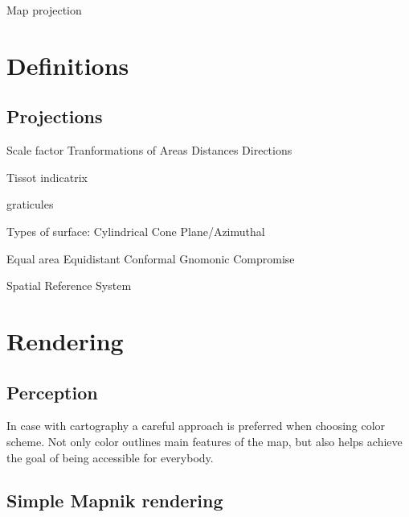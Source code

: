 \documentclass{article}
\begin{document}



\begin{description}
\item[Map projection]
\end{description}
\section{Definitions}



\subsection{Projections}



Scale factor
Tranformations of
Areas
Distances
Directions

Tissot indicatrix

graticules


Types of surface:
Cylindrical
Cone
Plane/Azimuthal

Equal area
Equidistant
Conformal
Gnomonic
Compromise

Spatial Reference System


\section{Rendering}

\subsection{Perception}

In case with cartography a careful approach is preferred when choosing
color scheme. Not only color outlines main features of the map, but also
helps achieve the goal of being accessible for everybody.

\subsection{Simple Mapnik rendering}
\end{document}
